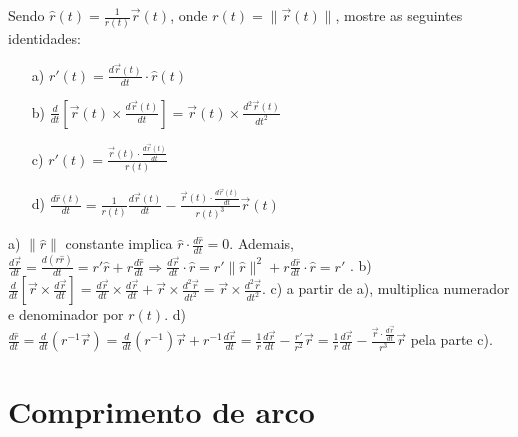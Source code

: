 \begin{exer}
Sendo $\hat{r}(t)=\frac{1}{r(t)} \vec{r}(t)$, onde $r(t)=\|\vec{r}(t)\|$,  mostre as seguintes identidades:
\begin{itemize}
\item[a)] $\displaystyle r'(t) = \frac{d\vec{r}(t)}{dt}\cdot \hat{r}(t)$
\item[b)] $\displaystyle \frac{d}{dt}\left[\vec{r}(t)\times\frac{d\vec{r}(t)}{dt}\right]=\vec{r}(t)\times\frac{d^2\vec{r}(t)}{dt^2}$ 
\item[c)] $\displaystyle r'(t)=\frac{\vec{r}(t)\cdot\frac{d\vec{r}(t)}{dt}}{r(t)}$ 
\item[d)] $\displaystyle \frac{d\hat{r}(t)}{dt}=\frac{1}{r(t)} \frac{d\vec{r}(t)}{dt}-\frac{\vec{r}(t)\cdot\frac{d\vec{r}(t)}{dt}}{r(t)^3} \vec{r}(t)$
\end{itemize}
\end{exer}
\begin{resp}
a) $\|\hat{r}\|$ constante implica $\hat{r} \cdot \frac{d\hat{r}}{dt}=0$. Ademais, $ \frac{d\vec{r}}{dt} = \frac{d(r \hat{r})}{dt} = r' \hat{r} + r \frac{d\hat{r}}{dt} \Rightarrow \frac{d\vec{r}}{dt} \cdot \hat{r} = 
r' \|\hat{r}\|^2 + r \frac{d\hat{r}}{dt} \cdot \hat{r} = r' $ 
. b) $\frac{d}{dt} \left[ \vec{r} \times \frac{d\vec{r}}{dt} \right] =
\frac{d \vec{r}}{dt} \times \frac{d \vec{r}}{dt} + \vec{r} \times \frac{d^2 \vec{r}}{dt^2} = \vec{r} \times \frac{d^2 \vec{r}}{dt^2} $. c) a partir de a), multiplica numerador e denominador por $r(t)$. d) $\frac{d\hat{r}}{dt} = 
\frac{d}{dt} \left( r^{-1} \vec{r} \right) = \frac{d}{dt} \left( r^{-1} \right) \vec{r} + r^{-1} \frac{d \vec{r}}{dt} = \frac{1}{r} \frac{d\vec{r}}{dt} - \frac{r'}{r^2} \vec{r} = \frac{1}{r} \frac{d \vec{r}}{dt} - \frac{ \vec{r} \cdot \frac{d \vec{r}}{dt} }{r^3} \vec{r} $ pela parte c). 
\end{resp}

 
\section{Comprimento de arco}
  
